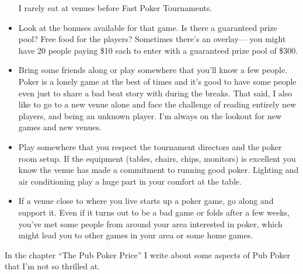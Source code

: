 \begin{itemize}
I rarely eat at venues before Fast Poker Tournaments.


\item Look at the bonuses available for that game. Is there a
guaranteed prize pool? Free food for the players? Sometimes
there's an overlay--- you might have 20 people paying \$10 each
to enter with a guaranteed prize pool of \$300.


\item Bring some friends along or play somewhere that you'll
know a few people. Poker is a lonely game at the best
of times and it's good to have some people even just to share
a bad beat story with during the breaks. That said, I also like
to go to a new venue alone and face the challenge of
reading entirely new players, and being an unknown player.
I'm always on the lookout for new games and new venues.

\item Play somewhere that you respect the tournament directors
and the poker room setup. If the equipment (tables, chairs, chips,
monitors) is excellent you know the venue has made a commitment
to running good poker. Lighting and air conditioning
play a huge part in your comfort at the table.

\item If a venue close to where you live starts
up a poker game, go along and support it. Even if it turns out to
be a bad game or folds after a few weeks, you've met some people
from around your area interested in poker, which might lead
you to other games in your area or some home games.

\end{itemize}

In the chapter ``The Pub Poker Price'' I write about some
aspects of Pub Poker that I'm not so thrilled at.
